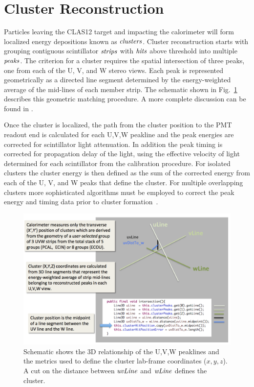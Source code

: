 \section{Cluster Reconstruction}

Particles leaving the CLAS12 target and impacting the calorimeter will form localized energy depositions known as ${\it clusters}$.  Cluster reconstruction starts with grouping contiguous scintillator ${\it strips}$ with ${\it hits}$ above threshold into multiple ${\it peaks}$.  The criterion for a cluster requires the spatial intersection of three peaks, one from each of the U, V, and W stereo views.  Each peak is represented geometrically as a directed line segment determined by the energy-weighted average of the mid-lines of each member strip.  The schematic shown in Fig.~\ref{fig:S6_0} describes this geometric matching procedure.  A more complete discussion can be found in \cite{nim:recon}.

Once the cluster is localized, the path from the cluster position to the PMT readout end is calculated for each
U,V,W peakline and the peak energies are corrected for scintillator light attenuation.  In addition the peak timing is corrected for propagation delay of the light, using the effective velocity of light determined for each scintillator from the calibration procedure.  For isolated clusters the cluster energy is then defined as the sum of the corrected energy from each of the U, V, and W peaks that define the cluster. For multiple overlapping clusters more sophisticated algorithms must be employed to correct the peak energy and timing data prior to cluster formation~\cite{nim:recon}.

\begin{figure}[hbt]
\centering
\includegraphics[width=0.95\columnwidth,keepaspectratio]{img/S6_0.png}
\caption{Schematic shows the 3D relationship of the U,V,W peaklines and the metrics used to define the cluster
  lab-frame coordinates ($x,y,z$). A cut on the distance between ${\it uvLine}$ and ${\it wLine}$ defines the cluster.}
\label{fig:S6_0}
\end{figure}

